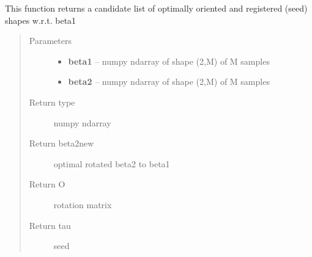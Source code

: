 \documentclass[letterpaper,10pt,english]{sphinxmanual}
\begin{document}

\begin{fulllineitems}
\label{curve_functions:curve_functions.find_rotation_and_seed_coord}
This function returns a candidate list of optimally oriented and
registered (seed) shapes w.r.t. beta1
\begin{quote}\begin{description}
\item[{Parameters}] \leavevmode\begin{itemize}
\item {} 
\textbf{beta1} -- numpy ndarray of shape (2,M) of M samples

\item {} 
\textbf{beta2} -- numpy ndarray of shape (2,M) of M samples

\end{itemize}

\item[{Return type}] \leavevmode
numpy ndarray

\item[{Return beta2new}] \leavevmode
optimal rotated beta2 to beta1

\item[{Return O}] \leavevmode
rotation matrix

\item[{Return tau}] \leavevmode
seed

\end{description}\end{quote}

\end{fulllineitems}

\end{document}
